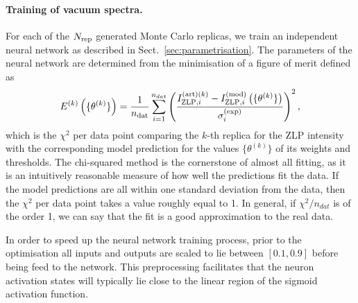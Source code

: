 \paragraph{Training of vacuum spectra.}
%
For each of the $N_{\rm rep}$ generated Monte Carlo replicas, we train an independent
neural network as described in Sect.~\ref{sec:parametrisation}.
%
The parameters of the neural network are determined from the minimisation of a figure of merit
defined as
\begin{equation}
  \label{eq:chi2}
\begin{centering}
  E^{(k)}\lp \{\theta^{(k)}\}\rp = \frac{1}{n_{\rm dat}}\sum_{i=1}^{n_{dat}}\left(\frac{ I_{{\rm ZLP},i}^{{\rm (art)}(k)} -
  I_{{\rm ZLP},i}^{{\rm (mod)}}\lp \{\theta^{(k)}\}\rp }{\sigma_i^{(\rm exp)}}\right)^2, 
\end{centering}
\end{equation}
which is the $\chi^2$ per data point comparing the $k$-th replica for the ZLP
intensity with the corresponding model prediction for the values
$\{\theta^{(k)}\}$ of its weights and thresholds.
%
The chi-squared method is the cornerstone of almost all fitting, 
as it is an intuitively reasonable measure of how well the predictions fit the data. 
%
If the model predictions are all within one standard deviation from the data, 
then the $\chi^2$ per data point takes a value roughly equal to 1. 
%
In general, if $\chi^2/n_{dat}$ is of the order 1, we can say that the 
fit is a good approximation to the real data. 

In order to speed up the neural network training process, prior to the optimisation
all inputs and outputs are scaled to lie between $[0.1, 0.9]$ before
being feed to the network.
%
This preprocessing facilitates that
 the neuron activation states will typically
lie close to the linear region of the sigmoid activation function.

